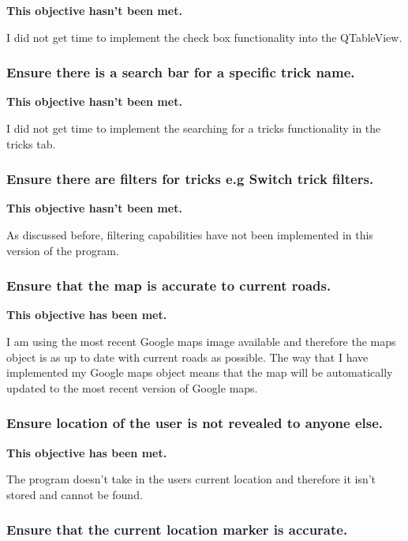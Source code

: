 \textbf{This objective hasn't been met.}

I did not get time to implement the check box functionality into the QTableView.

\subsubsection {Ensure there is a search bar for a specific trick name.}

\textbf{This objective hasn't been met.}

I did not get time to implement the searching for a tricks functionality in the tricks tab.

\subsubsection {Ensure there are filters for tricks e.g Switch trick filters.}

\textbf{This objective hasn't been met.}

As discussed before, filtering capabilities have not been implemented in this version of the program.




\subsubsection {Ensure that the map is accurate to current roads.}

\textbf{This objective has been met.}

I am using the most recent Google maps image available and therefore the maps object is as up to date with current roads as possible. The way that I have implemented my Google maps object means that the map will be automatically updated to the most recent version of Google maps.

\subsubsection {Ensure location of the user is not revealed to anyone else.}

\textbf{This objective has been met.}

The program doesn't take in the users current location and therefore it isn't stored and cannot be found.

\subsubsection {Ensure that the current location marker is accurate.}

